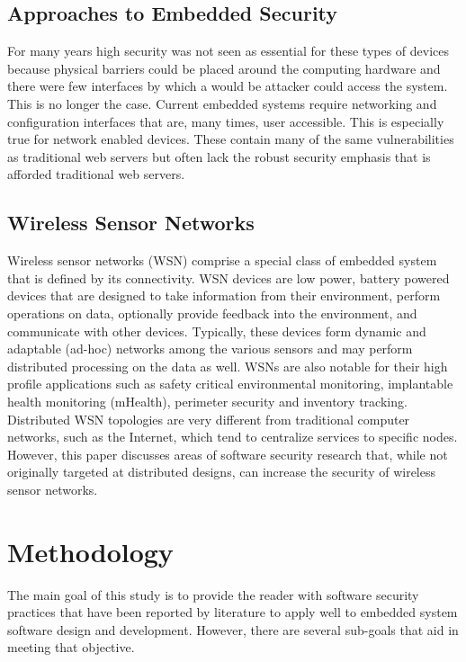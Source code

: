 \documentclass[final,conference,10pt]{IEEEtran}
\begin{document}
\subsection{Approaches to Embedded Security}

For many years high security was not seen as essential for these types of devices because physical barriers could be placed around the computing hardware and there were few interfaces by which a would be attacker could access the system.  This is no longer the case.  Current embedded systems require networking and configuration interfaces that are, many times, user accessible.  This is especially true for network enabled devices.  These contain many of the same vulnerabilities as traditional web servers but often lack the robust security emphasis that is afforded traditional web servers. \cite{Kumar2012}

\subsection{Wireless Sensor Networks}

Wireless sensor networks (WSN) comprise a special class of embedded system that is defined by its connectivity.  WSN devices are low power, battery powered devices that are designed to take information from their environment, perform operations on data, optionally provide feedback into the environment, and communicate with other devices.  Typically, these devices form dynamic and adaptable (ad-hoc) networks among the various sensors and may perform distributed processing on the data as well.  WSNs are also notable for their high profile applications such as safety critical environmental monitoring, implantable health monitoring (mHealth), perimeter security and inventory tracking.\cite{Bojinov2010,Mahdavi-Hezavehi2013}  Distributed WSN topologies are very different from traditional computer networks, such as the Internet, which tend to centralize services to specific nodes. However, this paper discusses areas of software security research that, while not originally targeted at distributed designs, can increase the security of wireless sensor networks.

\section{Methodology}
The main goal of this study is to provide the reader with software security practices that have been reported by literature to apply well to embedded system software design and development.  However, there are several sub-goals that aid in meeting that objective.  
\end{document}
